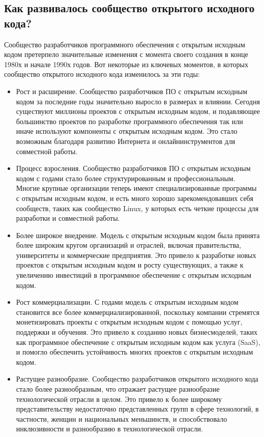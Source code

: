 \documentclass[letterpaper,10pt,russian]{sphinxmanual}
\begin{document}
\subsection{Как развивалось сообщество открытого исходного кода?}
\label{\detokenize{educational_materials/open_source/content:id2}}
\sphinxAtStartPar
Сообщество разработчиков программного обеспечения с открытым исходным кодом претерпело значительные изменения с момента своего создания в конце 1980\sphinxhyphen{}х и начале 1990\sphinxhyphen{}х годов. Вот некоторые из ключевых моментов, в которых сообщество открытого исходного кода изменилось за эти годы:
\begin{itemize}
\item {} 
\sphinxAtStartPar
Рост и расширение. Сообщество разработчиков ПО с открытым исходным кодом за последние годы значительно выросло в размерах и влиянии. Сегодня существуют миллионы проектов с открытым исходным кодом, и подавляющее большинство проектов по разработке программного обеспечения так или иначе используют компоненты с открытым исходным кодом. Это стало возможным благодаря развитию Интернета и онлайн\sphinxhyphen{}инструментов для совместной работы.

\item {} 
\sphinxAtStartPar
Процесс взросления. Сообщество разработчиков ПО с открытым исходным кодом с годами стало более структурированным и профессиональным. Многие крупные организации теперь имеют специализированные программы с открытым исходным кодом, и есть много хорошо зарекомендовавших себя сообществ, таких как сообщество Linux, у которых есть четкие процессы для разработки и совместной работы.

\item {} 
\sphinxAtStartPar
Более широкое внедрение. Модель с открытым исходным кодом была принята более широким кругом организаций и отраслей, включая правительства, университеты и коммерческие предприятия. Это привело к разработке новых проектов с открытым исходным кодом и росту существующих, а также к увеличению инвестиций в программное обеспечение с открытым исходным кодом.

\item {} 
\sphinxAtStartPar
Рост коммерциализации. С годами модель с открытым исходным кодом становится все более коммерциализированной, поскольку компании стремятся монетизировать проекты с открытым исходным кодом с помощью услуг, поддержки и обучения. Это привело к созданию новых бизнес\sphinxhyphen{}моделей, таких как программное обеспечение с открытым исходным кодом как услуга (SaaS), и помогло обеспечить устойчивость многих проектов с открытым исходным кодом.

\item {} 
\sphinxAtStartPar
Растущее разнообразие. Сообщество разработчиков открытого исходного кода стало более разнообразным, что отражает растущее разнообразие технологической отрасли в целом. Это привело к более широкому представительству недостаточно представленных групп в сфере технологий, в частности, женщин и национальных меньшинств, и способствовало инклюзивности и разнообразию в технологической отрасли.

\end{itemize}
\end{document}
